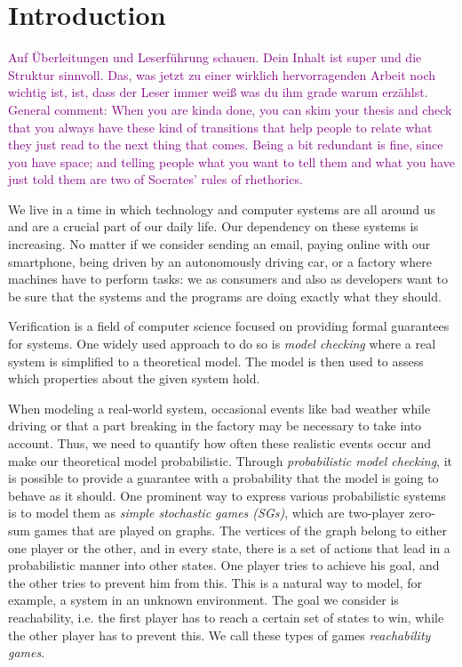 \chapter{Introduction} \label{ch:intro}

\textcolor{purple}{Auf Überleitungen und Leserführung schauen. Dein Inhalt ist super und die Struktur sinnvoll. Das, was jetzt zu einer wirklich hervorragenden Arbeit noch wichtig ist, ist, dass der Leser immer weiß was du ihm grade warum erzählst.}
\textcolor{purple}{General comment: When you are kinda done, you can skim your thesis and check that you always have these kind of transitions that help people to relate what they just read to the next thing that comes. Being a bit redundant is fine, since you have space; and telling people what you want to tell them and what you have just told them are two of Socrates' rules of rhethorics.}

We live in a time in which technology and computer systems are all around us and are a crucial part of our daily life. 
Our dependency on these systems is increasing. 
No matter if we consider sending an email, paying online with our smartphone, being driven by an autonomously driving car, or a factory where machines have to perform tasks: 
we as consumers and also as developers want to be sure that the systems and the programs are doing exactly what they should.

Verification is a field of computer science focused on providing formal guarantees for systems. 
One widely used approach to do so is \emph{model checking} where a real system is simplified to a theoretical model.
The model is then used to assess which properties about the given system hold.

When modeling a real-world system, occasional events like bad weather while driving or that a part breaking in the factory may be necessary to take into account. 
Thus, we need to quantify how often these realistic events occur and make our theoretical model probabilistic. 
Through \emph{probabilistic model checking}, it is possible to provide a guarantee with a probability that the model is going to behave as it should. 
One prominent way to express various probabilistic systems is to model them as \emph{simple stochastic games (SGs)}, which are two-player zero-sum games that are played on graphs. 
The vertices of the graph belong to either one player or the other, and in every state, there is a set of actions that lead in a probabilistic manner into other states. 
One player tries to achieve his goal, and the other tries to prevent him from this. This is a natural way to model, for example, a system in an unknown environment.
The goal we consider is reachability, i.e. the first player has to reach a certain set of states to win, while the other player has to prevent this. 
We call these types of games \emph{reachability games}.

